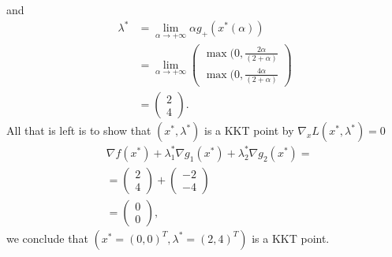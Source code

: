 and
\begin{align}
    \lambda^{*}
    &= \lim_{\alpha \to +\infty}\alpha g_+(x^{*}(\alpha))\\
    &= \lim_{\alpha \to +\infty}
    \begin{pmatrix}
        \max(0, \frac{2\alpha}{\left(2+\alpha\right) }\\
        \max(0, \frac{4\alpha}{\left(2+\alpha\right) }
    \end{pmatrix}\\
    &=
    \begin{pmatrix}2 \\ 4 \end{pmatrix}.
\end{align}
All that is left is to show that $(x^{*}, \lambda^{*})$ is a KKT point by
$\nabla_x L(x^{*},\lambda^{*}) =0$
\begin{align}
    &\nabla f(x^{*}) + \lambda_1^{*} \nabla g_1(x^{*}) + \lambda_2^{*}\nabla
    g_2(x^{*}) = \\
    &=
    \begin{pmatrix} 2\\ 4 \end{pmatrix}
    + \begin{pmatrix} -2 \\ -4 \end{pmatrix}\\
    &=\begin{pmatrix} 0\\0 \end{pmatrix},
\end{align}
we conclude that $\left(x^{*}=(0,0)^{T}, \lambda^{*} = (2, 4)^{T}\right)$ is a
KKT point.

